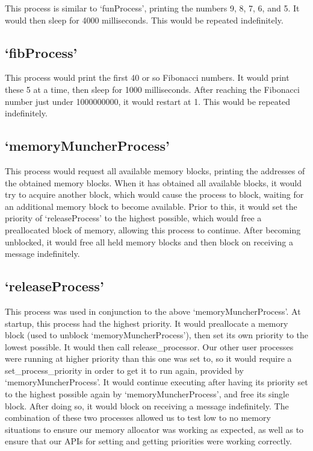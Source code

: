 \documentclass[12pt]{report}
\begin{document}
    This process is similar to `funProcess', printing the numbers 9, 8, 7, 6,
    and 5.  It would then sleep for 4000 milliseconds.  This would be repeated
    indefinitely.

\subsection{`fibProcess'}

    This process would print the first 40 or so Fibonacci numbers.  It would
    print these 5 at a time, then sleep for 1000 milliseconds.  After reaching
    the Fibonacci number just under 1000000000, it would restart at 1.  This
    would be repeated indefinitely.

\subsection{`memoryMuncherProcess'}

    This process would request all available memory blocks, printing the
    addresses of the obtained memory blocks.  When it has obtained all available
    blocks, it would try to acquire another block, which would cause the process
    to block, waiting for an additional memory block to become available.  Prior
    to this, it would set the priority of `releaseProcess' to the highest
    possible, which would free a preallocated block of memory, allowing this
    process to continue.  After becoming unblocked, it would free all held
    memory blocks and then block on receiving a message indefinitely.

\subsection{`releaseProcess'}

    This process was used in conjunction to the above `memoryMuncherProcess'.
    At startup, this process had the highest priority.  It would preallocate a
    memory block (used to unblock `memoryMuncherProcess'), then set its own
    priority to the lowest possible.  It would then call release\_processor.
    Our other user processes were running at higher priority than this one was
    set to, so it would require a set\_process\_priority in order to get it to
    run again, provided by `memoryMuncherProcess'.  It would continue executing
    after having its priority set to the highest possible again by
    `memoryMuncherProcess', and free its single block.  After doing so, it would
    block on receiving a message indefinitely.  The combination of these two
    processes allowed us to test low to no memory situations to ensure our
    memory allocator was working as expected, as well as to ensure that our
    APIs for setting and getting priorities were working correctly.
\end{document}

